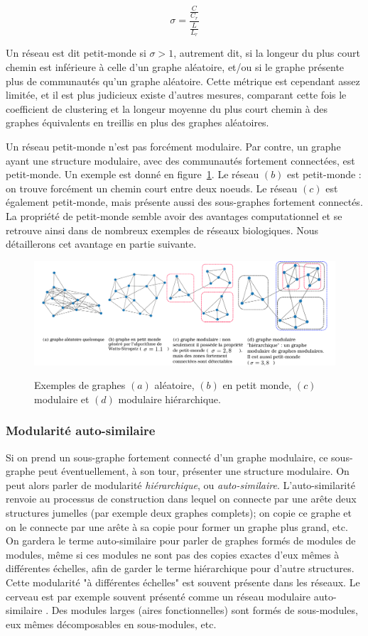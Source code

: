 $$\sigma = \frac{\frac{C}{C_r}}{\frac{L}{L_r}} $$

Un réseau est dit petit-monde si $\sigma > 1$, autrement dit, si la longeur du plus court chemin est inférieure à celle d'un graphe aléatoire, et/ou si le graphe présente plus de communautés qu'un graphe aléatoire. Cette métrique est cependant assez limitée, et il est plus judicieux existe d'autres mesures, comparant cette fois le coefficient de clustering et la longeur moyenne du plus court chemin à des graphes équivalents en treillis en plus des graphes aléatoires. 

Un réseau petit-monde n'est pas forcément modulaire. Par contre, un graphe ayant une structure modulaire, avec des communautés fortement connectées, est petit-monde. Un exemple est donné en figure~\ref{fig:graphe}. Le réseau $(b)$ est petit-monde : on trouve forcément un chemin court entre deux noeuds. Le réseau $(c)$ est également petit-monde, mais présente aussi des sous-graphes fortement connectés. 
La propriété de petit-monde semble avoir des avantages computationnel et se retrouve ainsi dans de nombreux exemples de réseaux biologiques. Nous détaillerons cet avantage en partie suivante. 

\begin{figure}
\centering
\includegraphics[width=\textwidth]{types_graphes.pdf}
\label{fig:graphe}
\caption{Exemples de graphes $(a)$ aléatoire, $(b)$ en petit monde, $(c)$ modulaire et $(d)$ modulaire hiérarchique.}
\end{figure}


\subsubsection{Modularité auto-similaire}

Si on prend un sous-graphe fortement connecté d'un graphe modulaire, ce sous-graphe peut éventuellement, à son tour, présenter une structure modulaire. On peut alors parler de modularité \emph{hiérarchique}, ou \emph{auto-similaire}. L'auto-similarité renvoie au processus de construction dans lequel on connecte par une arête deux structures jumelles (par exemple deux graphes complets); on copie ce graphe et on le connecte par une arête à sa copie pour former un graphe plus grand, etc. On gardera le terme auto-similaire pour parler de graphes formés de modules de modules, même si ces modules ne sont pas des copies exactes d'eux mêmes à différentes échelles, afin de garder le terme hiérarchique pour d'autre structures. Cette modularité "à différentes échelles" est souvent présente dans les réseaux. Le cerveau est par exemple souvent présenté comme un réseau modulaire auto-similaire \cite{Meunier2010ModularAH}. Des modules larges (aires fonctionnelles) sont formés de sous-modules, eux mêmes décomposables en sous-modules, etc. 


